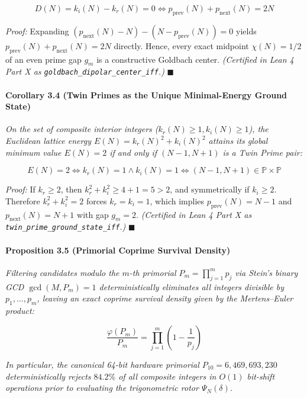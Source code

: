 \documentclass[
  11pt,
]{article}
\begin{document}
\[D(N) = k_i(N) - k_r(N) = 0 \iff p_{\text{prev}}(N) + p_{\text{next}}(N) = 2N\]

\emph{Proof:} Expanding
\((p_{\text{next}}(N) - N) - (N - p_{\text{prev}}(N)) = 0\) yields
\(p_{\text{prev}}(N) + p_{\text{next}}(N) = 2N\) directly. Hence, every
exact midpoint \(\chi(N) = 1/2\) of an even prime gap \(g_m\) is a
constructive Goldbach center. \emph{(Certified in Lean 4 Part X as
\texttt{goldbach\_dipolar\_center\_iff}.)} \(\blacksquare\)

\paragraph{Corollary 3.4 (Twin Primes as the Unique Minimal-Energy
Ground
State)}\label{corollary-3.4-twin-primes-as-the-unique-minimal-energy-ground-state}

\emph{On the set of composite interior integers
(\(k_r(N) \ge 1, k_i(N) \ge 1\)), the Euclidean lattice energy
\(E(N) = k_r(N)^2 + k_i(N)^2\) attains its global minimum value
\(E(N) = 2\) if and only if \((N - 1, N + 1)\) is a Twin Prime pair:}

\[E(N) = 2 \iff k_r(N) = 1 \land k_i(N) = 1 \iff (N - 1, N + 1) \in \mathbb{P} \times \mathbb{P}\]

\emph{Proof:} If \(k_r \ge 2\), then
\(k_r^2 + k_i^2 \ge 4 + 1 = 5 > 2\), and symmetrically if \(k_i \ge 2\).
Therefore \(k_r^2 + k_i^2 = 2\) forces \(k_r = k_i = 1\), which implies
\(p_{\text{prev}}(N) = N - 1\) and \(p_{\text{next}}(N) = N + 1\) with
gap \(g_m = 2\). \emph{(Certified in Lean 4 Part X as
\texttt{twin\_prime\_ground\_state\_iff}.)} \(\blacksquare\)

\paragraph{Proposition 3.5 (Primorial Coprime Survival
Density)}\label{proposition-3.5-primorial-coprime-survival-density}

\emph{Filtering candidates modulo the \(m\)-th primorial
\(P_m = \prod_{j=1}^m p_j\) via Stein's binary GCD \(\gcd(M, P_m) = 1\)
deterministically eliminates all integers divisible by
\(p_1, \dots, p_m\), leaving an exact coprime survival density given by
the Mertens--Euler product:}

\[\frac{\varphi(P_m)}{P_m} = \prod_{j=1}^m \left(1 - \frac{1}{p_j}\right)\]

\emph{In particular, the canonical 64-bit hardware primorial
\(P_{10} = 6{,}469{,}693{,}230\) deterministically rejects \(84.2\%\) of
all composite integers in \(O(1)\) bit-shift operations prior to
evaluating the trigonometric rotor \(\Psi_N(\delta)\).}
\end{document}

